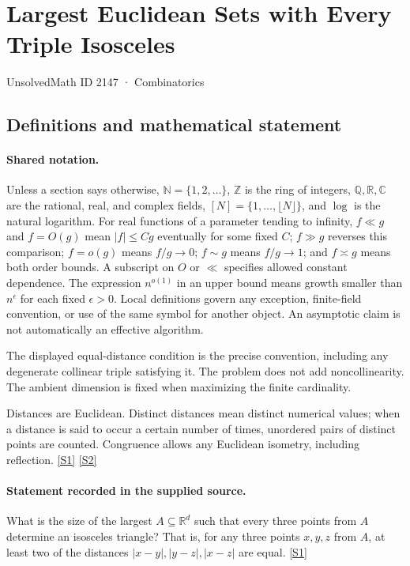 \documentclass[11pt,a4paper]{article}
\newcommand{\N}{\mathbb{N}}
\newcommand{\Z}{\mathbb{Z}}
\newcommand{\Q}{\mathbb{Q}}
\newcommand{\R}{\mathbb{R}}
\newcommand{\C}{\mathbb{C}}
\newcommand{\sref}[2]{\hyperlink{source:#1:#2}{[S#2]}}
\begin{document}

\setcounter{section}{2146}

\section{Largest Euclidean Sets with Every Triple Isosceles}\label{2147}

{\small\sffamily UnsolvedMath ID 2147 · Combinatorics}

\subsection{Definitions and mathematical statement}

\paragraph{Shared notation.}Unless a section says otherwise, $\N=\{1,2,\ldots\}$,
$\Z$ is the ring of integers, $\Q,\R,\C$ are the rational, real, and complex
fields, $[N]=\{1,\ldots,\lfloor N\rfloor\}$, and $\log$ is the natural
logarithm. For real functions of a parameter tending to infinity,
$f\ll g$ and $f=O(g)$ mean $|f|\leq Cg$ eventually for some fixed $C$;
$f\gg g$ reverses this comparison; $f=o(g)$ means $f/g\to0$;
$f\sim g$ means $f/g\to1$; and $f\asymp g$ means both order bounds.
A subscript on $O$ or $\ll$ specifies allowed constant dependence.
The expression $n^{o(1)}$ in an upper bound means growth smaller than
$n^\epsilon$ for each fixed $\epsilon>0$. Local definitions govern any
exception, finite-field convention, or use of the same symbol for another
object. An asymptotic claim is not automatically an effective algorithm.



The displayed equal-distance condition is the precise convention, including any degenerate collinear triple satisfying it. The problem does not add noncollinearity. The ambient dimension is fixed when maximizing the finite cardinality.

Distances are Euclidean. Distinct distances mean distinct numerical values; when a distance is said to occur a certain number of times, unordered pairs of distinct points are counted. Congruence allows any Euclidean isometry, including reflection. \sref{2147}{1} \sref{2147}{2}

\paragraph{Statement recorded in the supplied source.}
What is the size of the largest $A\subseteq \mathbb{R}^d$ such that every three points from $A$ determine an isosceles triangle? That is, for any three points $x,y,z$ from $A$, at least two of the distances $\lvert x-y\rvert,\lvert y-z\rvert,\lvert x-z\rvert$ are equal. \sref{2147}{1}
\end{document}
